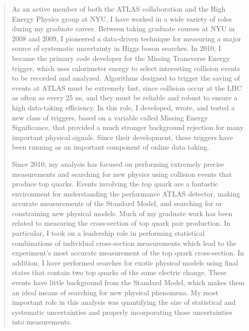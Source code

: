 \documentclass[9pt]{article}
\newenvironment{changemargin}[2]{%
  \begin{list}{}{%
    \setlength{\topsep}{0pt}%
    \setlength{\leftmargin}{#1}%
    \setlength{\rightmargin}{#2}%
    \setlength{\listparindent}{\parindent}%
    \setlength{\itemindent}{\parindent}%
    \setlength{\parsep}{\parskip}%
  }%
  \item[]}{\end{list}
}
\newenvironment{body} {
	\vspace*{-16pt}
	\begin{changemargin}{-0.25in}{-0.5in}
  }	
	{\end{changemargin}
}
\begin{document}
\begin{body}
\begin{quotation}
          As an active member of both the ATLAS collaboration and the High Energy Physics group at NYU, I have worked in a wide variety of roles during my graduate career. 
          Between taking graduate courses at NYU in 2008 and 2009, I pioneered a data-driven technique for measuring a major source of systematic uncertainty in Higgs boson searches. 
          In 2010, I became the primary code developer for the Missing Transverse Energy trigger, 
          which uses calorimeter energy to select interesting collision events to be recorded and analyzed.  
          Algorithms designed to trigger the saving of events at ATLAS must be extremely fast, since collision occur at the LHC as often as every 25 ns, 
          and they must be reliable and robust to ensure a high data-taking efficiency. 
          In this role, I developed, wrote, and tested a new class of triggers, based on a variable called Missing Energy Significance, 
          that provided a much stronger background rejection for many important physical signals. 
          Since their development, these triggers have been running as an important component of online data taking.

          \smallskip

          Since 2010, my analysis has focused on performing extremely precise measurements and searching for new physics using collision events that produce top quarks.  
          Events involving the top quark are a fantastic environment for understanding the performance ATLAS detector, 
          making accurate measurements of the Standard Model, and searching for or constraining new physical models. 
          Much of my graduate work has been related to measuring the cross-section of top quark pair production. 
          In particular, I took on a leadership role in performing statistical combinations of individual cross-section measurements 
          which lead to the experiment's most accurate measurement of the top quark cross-section.
          In addition, I have performed searches for exotic physical models using final states that contain two top quarks of the same electric change. 
          These events have little background from the Standard Model, which makes them an ideal means of searching for new physical phenomena.
          My most important role in this analysis was quantifying the size of statistical and systematic uncertainties and properly incorporating those uncertainties into measurements.


\end{quotation}
\end{body}
\end{document}
